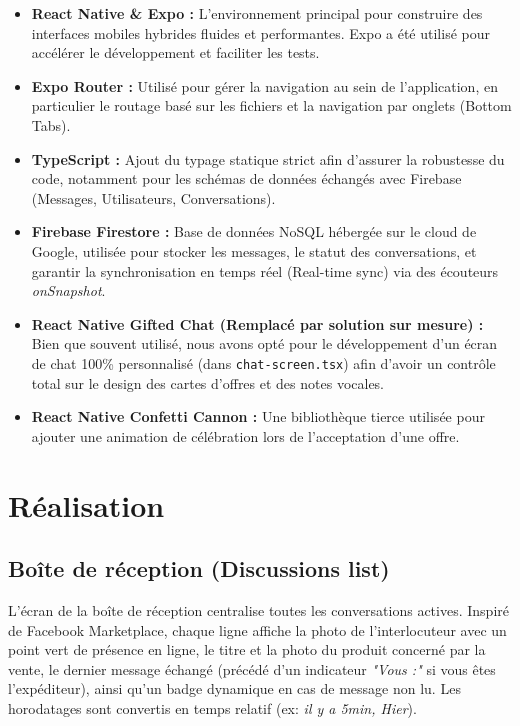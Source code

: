 \documentclass[12pt,a4paper]{report}
\begin{document}
\begin{itemize}
    \item \textbf{React Native \& Expo :} L'environnement principal pour construire des interfaces mobiles hybrides fluides et performantes. Expo a été utilisé pour accélérer le développement et faciliter les tests.
    \item \textbf{Expo Router :} Utilisé pour gérer la navigation au sein de l'application, en particulier le routage basé sur les fichiers et la navigation par onglets (Bottom Tabs).
    \item \textbf{TypeScript :} Ajout du typage statique strict afin d'assurer la robustesse du code, notamment pour les schémas de données échangés avec Firebase (Messages, Utilisateurs, Conversations).
    \item \textbf{Firebase Firestore :} Base de données NoSQL hébergée sur le cloud de Google, utilisée pour stocker les messages, le statut des conversations, et garantir la synchronisation en temps réel (Real-time sync) via des écouteurs \textit{onSnapshot}.
    \item \textbf{React Native Gifted Chat (Remplacé par solution sur mesure) :} Bien que souvent utilisé, nous avons opté pour le développement d'un écran de chat 100\% personnalisé (dans \texttt{chat-screen.tsx}) afin d'avoir un contrôle total sur le design des cartes d'offres et des notes vocales.
    \item \textbf{React Native Confetti Cannon :} Une bibliothèque tierce utilisée pour ajouter une animation de célébration lors de l'acceptation d'une offre.
\end{itemize}

\chapter{Réalisation}

\section{Boîte de réception (Discussions list)}
L'écran de la boîte de réception centralise toutes les conversations actives. Inspiré de Facebook Marketplace, chaque ligne affiche la photo de l'interlocuteur avec un point vert de présence en ligne, le titre et la photo du produit concerné par la vente, le dernier message échangé (précédé d'un indicateur \textit{"Vous :"} si vous êtes l'expéditeur), ainsi qu'un badge dynamique en cas de message non lu. Les horodatages sont convertis en temps relatif (ex: \textit{il y a 5min, Hier}).
\end{document}
